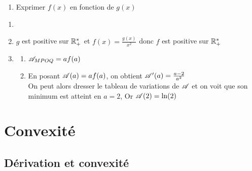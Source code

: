 \documentclass[oneside,12pt]{book}          %
\begin{document}
\begin{hint}
	\begin{enumerate}
		\item[2.] Exprimer $f(x)$ en fonction de $g(x)$
	\end{enumerate}
\end{hint}
\begin{sol}
	\begin{enumerate}
		\item {}
		\item $g$ est positive sur ${\mathbb R}^*_+$ et $f(x)=\frac{g(x)}{x^2}$ donc $f$ est positive sur ${\mathbb R}^*_+$
		\item \begin{enumerate}
			\item ${\mathscr{A}}_{MPOQ}=af(a)$
			\item En posant ${\mathscr{A}}(a)=af(a)$, on obtient ${\mathscr{A}}'(a)=\frac{a-2}{a^2}$\\
			On peut alors dresser le tableau de variations de ${\mathscr{A}}$ et on voit que son minimum est atteint en $a=2$, Or ${\mathscr{A}}(2)=\ln(2)$
		\end{enumerate}		 
	\end{enumerate}
\end{sol}





\chapter{Convexité}
\newpage


\section{Dérivation et convexité}
\end{document}
